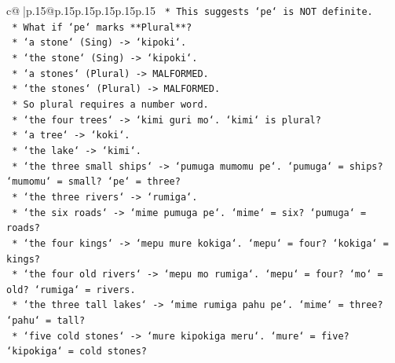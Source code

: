 \documentclass{article}
\begin{document}
{\begin{supertabular}{c@{$\;$}|p{.15\linewidth}@{}p{.15\linewidth}p{.15\linewidth}p{.15\linewidth}p{.15\linewidth}p{.15\linewidth}}
{{{\texttt{                                            *   This suggests `pe` is NOT definite.} \\
\texttt{                                            *   What if `pe` marks **Plural**?} \\
\texttt{                                                *   `a stone` (Sing) {-}> `kipoki`.} \\
\texttt{                                                *   `the stone` (Sing) {-}> `kipoki`.} \\
\texttt{                                                *   `a stones` (Plural) {-}> MALFORMED.} \\
\texttt{                                                *   `the stones` (Plural) {-}> MALFORMED.} \\
\texttt{                                                *   So plural requires a number word.} \\
\texttt{                                                *   `the four trees` {-}> `kimi guri mo`. `kimi` is plural?} \\
\texttt{                                                *   `a tree` {-}> `koki`.} \\
\texttt{                                                *   `the lake` {-}> `kimi`.} \\
\texttt{                                                *   `the three small ships` {-}> `pumuga mumomu pe`. `pumuga` = ships? `mumomu` = small? `pe` = three?} \\
\texttt{                                                *   `the three rivers` {-}> `rumiga`.} \\
\texttt{                                                *   `the six roads` {-}> `mime pumuga pe`. `mime` = six? `pumuga` = roads?} \\
\texttt{                                                *   `the four kings` {-}> `mepu mure kokiga`. `mepu` = four? `kokiga` = kings?} \\
\texttt{                                                *   `the four old rivers` {-}> `mepu mo rumiga`. `mepu` = four? `mo` = old? `rumiga` = rivers.} \\
\texttt{                                                *   `the three tall lakes` {-}> `mime rumiga pahu pe`. `mime` = three? `pahu` = tall?} \\
\texttt{                                                *   `five cold stones` {-}> `mure kipokiga meru`. `mure` = five? `kipokiga` = cold stones?} \\
}}}
\end{supertabular}}
\end{document}
